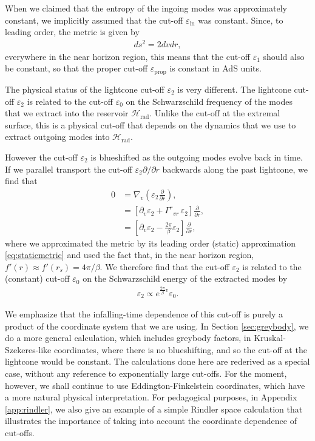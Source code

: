 \documentclass[11pt,a4paper]{article}
\begin{document}
When we claimed that the entropy of the ingoing modes was approximately constant, we implicitly assumed that the cut-off $\varepsilon_\text{in}$ was constant. Since, to leading order, the metric is given by
\begin{align}
ds^2 = 2 dv dr,
\end{align}
everywhere in the near horizon region, this means that the cut-off $\varepsilon_1$ should also be constant, so that the proper cut-off $\varepsilon_\text{prop}$ is constant in AdS units. 

The physical status of the lightcone cut-off $\varepsilon_2$ is very different. The lightcone cut-off $\varepsilon_2$ is related to the cut-off $\varepsilon_0$ on the Schwarzschild frequency of the modes that we extract into the reservoir $\mathcal{H}_\text{rad}$. Unlike the cut-off at the extremal surface, this is a physical cut-off that depends on the dynamics that we use to extract outgoing modes into $\mathcal{H}_\text{rad}$. 

However the cut-off $\varepsilon_2$ is blueshifted as the outgoing modes evolve back in time. If we parallel transport the cut-off $\varepsilon_2 \partial/ \partial r$ backwards along the past lightcone, we find that
\begin{align}
0 &= \nabla_v \left(\varepsilon_2 \frac{\partial}{\partial r}\right),
\\&= \left[\partial_v \varepsilon_2 + \Gamma^r{}_{vr} \,\varepsilon_2 \right] \frac{\partial}{\partial r},
\\& = \left[\partial_v \varepsilon_2 - \frac{2 \pi}{\beta} \varepsilon_2 \right] \frac{\partial}{\partial r},
\end{align}
where we approximated the metric by its leading order (static) approximation \eqref{eq:staticmetric} and used the fact that, in the near horizon region, $f'(r) \approx f'(r_s) = 4 \pi/ \beta$. We therefore find that the cut-off $\varepsilon_2$ is related to the (constant) cut-off $\varepsilon_0$ on the Schwarzschild energy of the extracted modes by
\begin{align} \label{eq:cutoffscaling}
\varepsilon_2 \propto e^{\frac{2\pi}{\beta}v} \varepsilon_0.
\end{align}

We emphasize that the infalling-time dependence of this cut-off is purely a product of the coordinate system that we are using. In Section \ref{sec:greybody}, we do a more general calculation, which includes greybody factors, in Kruskal-Szekeres-like coordinates, where there is no blueshifting, and so the cut-off at the lightcone would be constant. The calculations done here are rederived as a special case, without any reference to exponentially large cut-offs. For the moment, however, we shall continue to use Eddington-Finkelstein coordinates, which have a more natural physical interpretation. For pedagogical purposes, in Appendix \ref{app:rindler}, we also give an example of a simple Rindler space calculation that illustrates the importance of taking into account the coordinate dependence of cut-offs.
\end{document}
